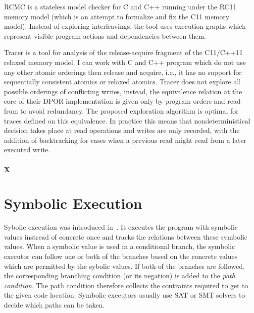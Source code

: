 
RCMC  is a stateless model checker for C and C++ running under the RC11 memory model  (which is an attempt to formalize and fix the C11 memory model).
Instead of exploring interleavings, the tool uses execution graphs which represent visible program actions and dependencies between them.

Tracer  is a tool for analysis of the release-acquire fragment of the C11/C++11 relaxed memory model.
I can work with C and C++ program which do not use any other atomic orderings then release and acquire, i.e., it has no support for sequentially consistent atomics or relaxed atomics.
Tracer does not explore all possible orderings of conflicting writes, instead, the equivalence relation at the core of their DPOR implementation is given only by program orders and read-from to avoid redundancy.
The proposed exploration algorithm is optimal for traces defined on this equivalence.
In practice this means that nondeterministical decision takes place at read operations and writes are only recorded, with the addition of backtracking for cases when a previous read might read from a later executed write.

\paragraph{X}




\section{Symbolic Execution}

Sybolic execution was introduced in~.
It executes the program with symbolic values instread of concrete once and tracks the relations between these symbolic values.
When a symbolic value is used in a conditional branch, the symbolic executor can follow one or both of the branches based on the concrete values which are permitted by the sybolic values.
If both of the branches are followed, the corresponding branching condition (or its negation) is added to the \emph{path condition}.
The path condition therefore collects the contraints required to get to the given code location.
Symbolic executors usually use SAT or SMT solvers to decide which paths can be taken.

